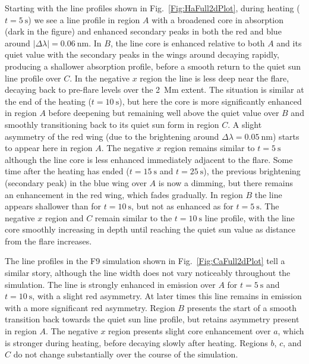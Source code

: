 Starting with the \Ha{} line profiles shown in Fig.~\ref{Fig:HaFull2dPlot}, during heating ($t=\SI{5}{\second}$) we see a line profile in region $A$ with a broadened core in absorption (dark in the figure) and enhanced secondary peaks in both the red and blue around $|\Delta\lambda|=\SI{0.06}{\nano\metre}$.
In $B$, the line core is enhanced relative to both $A$ and its quiet value with the secondary peaks in the wings around decaying rapidly, producing a shallower absorption profile, before a smooth return to the quiet sun line profile over $C$.
In the negative $x$ region the line is less deep near the flare, decaying back to pre-flare levels over the \SI{2}{\mega\metre} extent.
The situation is similar at the end of the heating ($t=\SI{10}{\second}$), but here the core is more significantly enhanced in region $A$ before deepening but remaining well above the quiet value over $B$ and smoothly transitioning back to its quiet sun form in region $C$.
A slight asymmetry of the red wing (due to the brightening around $\Delta\lambda = \SI{0.05}{\nano\metre}$) starts to appear here in region $A$.
The negative $x$ region remains similar to $t=\SI{5}{\second}$ although the line core is less enhanced immediately adjacent to the flare.
Some time after the heating has ended ($t=\SI{15}{\second}$ and $t=\SI{25}{\second}$), the previous brightening (secondary peak) in the blue wing over $A$ is now a dimming, but there remains an enhancement in the red wing, which fades gradually.
In region $B$ the line appears shallower than for $t=\SI{10}{\second}$, but not as enhanced as for $t=\SI{5}{\second}$.
The negative $x$ region and $C$ remain similar to the $t=\SI{10}{\second}$ line profile, with the line core smoothly increasing in depth until reaching the quiet sun value as distance from the flare increases.

The \CaLine{} line profiles in the F9 simulation shown in Fig.~\ref{Fig:CaFull2dPlot} tell a similar story, although the line width does not vary noticeably throughout the simulation.
The line is strongly enhanced in emission over $A$ for $t=\SI{5}{\second}$ and $t=\SI{10}{\second}$, with a slight red asymmetry.
At later times this line remains in emission with a more significant red asymmetry.
Region $B$ presents the start of a smooth transition back towards the quiet sun line profile, but retains asymmetry present in region $A$.
The negative $x$ region presents slight core enhancement over $a$, which is stronger during heating, before decaying slowly after heating.
Regions $b$, $c$, and $C$ do not change substantially over the course of the simulation.

